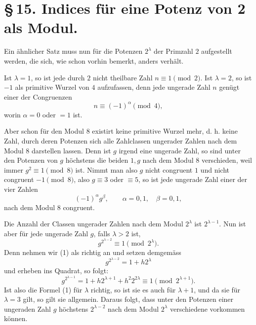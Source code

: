 \documentclass[11pt]{article}
\begin{document}
\section*{\S\,15. Indices für eine Potenz von 2 als Modul.}

Ein ähnlicher Satz muss nun für die Potenzen $2^\lambda$ der Primzahl $2$ aufgestellt werden, die sich, wie schon vorhin bemerkt, anders verhält.

Ist $\lambda=1$, so ist jede durch $2$ nicht theilbare Zahl $n\equiv1\pmod2$. Ist $\lambda=2$, so ist $-1$ als primitive Wurzel von $4$ aufzufassen, denn jede ungerade Zahl $n$ genügt einer der Congruenzen
\[
n\equiv(-1)^\alpha\pmod4,
\]
worin $\alpha=0$ oder $=1$ ist.

Aber schon für den Modul $8$ existirt keine primitive Wurzel mehr, d. h. keine Zahl, durch deren Potenzen sich alle Zahlclassen ungerader Zahlen nach dem Modul $8$ darstellen lassen. Denn ist $g$ irgend eine ungerade Zahl, so sind unter den Potenzen von $g$ höchstens die beiden $1,g$ nach dem Modul $8$ verschieden, weil immer $g^2\equiv1\pmod8$ ist. Nimmt man also $g$ nicht congruent $1$ und nicht congruent $-1\pmod8$, also $g\equiv3$ oder $\equiv5$, so ist jede ungerade Zahl einer der vier Zahlen
\[
(-1)^\alpha g^\beta,
\qquad
\alpha=0,1,
\quad
\beta=0,1,
\]
nach dem Modul $8$ congruent.

Die Anzahl der Classen ungerader Zahlen nach dem Modul $2^\lambda$ ist $2^{\lambda-1}$. Nun ist aber für jede ungerade Zahl $g$, falls $\lambda>2$ ist,
\begin{equation}
g^{2^{\lambda-2}}\equiv1\pmod{2^\lambda}.
\tag{1}
\end{equation}
Denn nehmen wir (1) als richtig an und setzen demgemäss
\[
g^{2^{\lambda-2}}=1+h2^\lambda
\]
und erheben ins Quadrat, so folgt:
\[
g^{2^{\lambda-1}}=1+h2^{\lambda+1}+h^2 2^{2\lambda}
\equiv1\pmod{2^{\lambda+1}}.
\]
Ist also die Formel (1) für $\lambda$ richtig, so ist sie es auch für $\lambda+1$, und da sie für $\lambda=3$ gilt, so gilt sie allgemein. Daraus folgt, dass unter den Potenzen einer ungeraden Zahl $g$ höchstens $2^{\lambda-2}$ nach dem Modul $2^\lambda$ verschiedene vorkommen können.
\end{document}
